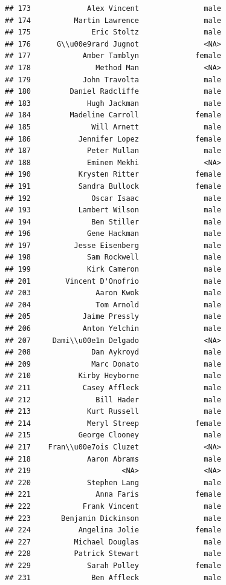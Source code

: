 \documentclass[
]{article}
\begin{document}
\begin{verbatim}
## 173             Alex Vincent               male
## 174          Martin Lawrence               male
## 175              Eric Stoltz               male
## 176      G\\u00e9rard Jugnot               <NA>
## 177            Amber Tamblyn             female
## 178               Method Man               <NA>
## 179            John Travolta               male
## 180         Daniel Radcliffe               male
## 183             Hugh Jackman               male
## 184         Madeline Carroll             female
## 185              Will Arnett               male
## 186           Jennifer Lopez             female
## 187             Peter Mullan               male
## 188             Eminem Mekhi               <NA>
## 190           Krysten Ritter             female
## 191           Sandra Bullock             female
## 192              Oscar Isaac               male
## 193           Lambert Wilson               male
## 194              Ben Stiller               male
## 196             Gene Hackman               male
## 197          Jesse Eisenberg               male
## 198             Sam Rockwell               male
## 199             Kirk Cameron               male
## 201        Vincent D'Onofrio               male
## 203               Aaron Kwok               male
## 204               Tom Arnold               male
## 205            Jaime Pressly               male
## 206            Anton Yelchin               male
## 207     Dami\\u00e1n Delgado               <NA>
## 208              Dan Aykroyd               male
## 209              Marc Donato               male
## 210           Kirby Heyborne               male
## 211            Casey Affleck               male
## 212               Bill Hader               male
## 213             Kurt Russell               male
## 214             Meryl Streep             female
## 215           George Clooney               male
## 217    Fran\\u00e7ois Cluzet               <NA>
## 218             Aaron Abrams               male
## 219                     <NA>               <NA>
## 220             Stephen Lang               male
## 221               Anna Faris             female
## 222            Frank Vincent               male
## 223       Benjamin Dickinson               male
## 224           Angelina Jolie             female
## 227          Michael Douglas               male
## 228          Patrick Stewart               male
## 229             Sarah Polley             female
## 231              Ben Affleck               male

\end{verbatim}
\end{document}
